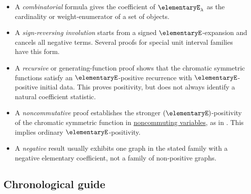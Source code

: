 \begin{itemize}
\item
A \emph{combinatorial} formula gives the coefficient of
$\elementaryE_\lambda$ as the cardinality or weight-enumerator of a set of
objects.

\item
A \emph{sign-reversing involution} starts from a signed
$\elementaryE$-expansion and cancels all negative terms. Several proofs for
special unit interval families have this form.

\item
A \emph{recursive} or generating-function proof shows that the chromatic
symmetric functions satisfy an $\elementaryE$-positive recurrence with
$\elementaryE$-positive initial data. This proves positivity, but does not
always identify a natural coefficient statistic.

\item
A \emph{noncommutative} proof establishes the stronger
$(\elementaryE)$-positivity of the chromatic symmetric function in
\hyperref[schurInNonCom]{noncommuting variables}, as in
\cite{GebhardSagan2001}.  This implies ordinary
$\elementaryE$-positivity.

\item
A \emph{negative} result usually exhibits one graph in the stated family with
a negative elementary coefficient, not a family of non-positive graphs.
\end{itemize}

\subsection[chromaticEExpansionChronology]{Chronological guide}



